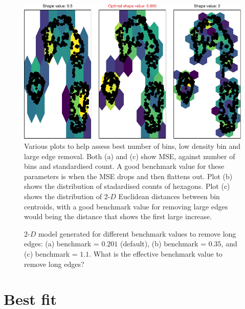 \documentclass[
  12pt]{article}
\begin{document}
\begin{figure}[H]

{\centering \includegraphics[width=1\textwidth,height=\textheight]{paper_files/figure-pdf/unnamed-chunk-31-1.pdf}

}

\caption{Various plots to help assess best number of bins, low density
bin and large edge removal. Both (a) and (c) show MSE, against number of
bins and standardised count. A good benchmark value for these parameters
is when the MSE drops and then flattens out. Plot (b) shows the
distribution of stadardised counts of hexagons. Plot (c) shows the
distribution of \(2\text{-}D\) Euclidean distances between bin
centroids, with a good benchmark value for removing large edges would
being the distance that shows the first large increase.}

\end{figure}%

\begin{figure}[H]


\caption{\label{fig-lg-scurve}\(2\text{-}D\) model generated for
different benchmark values to remove long edges: (a) benchmark =
\(0.201\) (default), (b) benchmark = \(0.35\), and (c) benchmark =
\(1.1\). What is the effective benchmark value to remove long edges?}

\end{figure}%

\section{Best fit}\label{best-fit}
\end{document}
